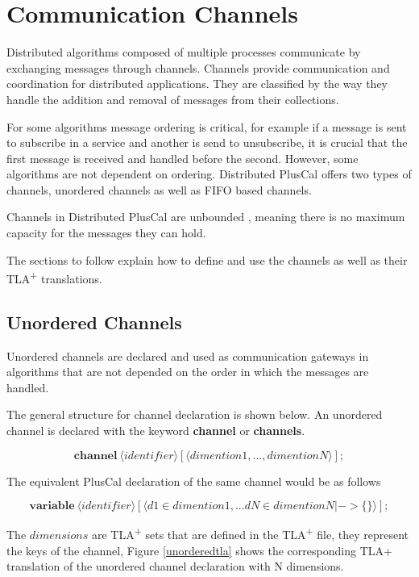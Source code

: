 \documentclass{thesul}
\newcommand{\tlaplus}{TLA\textsuperscript{+}\xspace}
\newcommand{\keyword}[1]{\textbf{#1}}
\newcommand{\entity}[1]{\ensuremath{\langle}#1\ensuremath{\rangle}}
\begin{document}
\FloatBarrier
\section{Communication Channels}
\label{comChannels}

Distributed algorithms composed of multiple processes communicate by exchanging messages through channels. Channels provide communication and coordination for distributed applications. They are classified by the way they handle the addition and removal of messages from their collections. 

For some algorithms message ordering is critical, for example if a message is sent to subscribe in a service and another is send to unsubscribe, it is crucial that the first message is received and handled before the second. However, some algorithms are not dependent on ordering. Distributed PlusCal offers two types of channels, unordered channels as well as FIFO based channels.

Channels in Distributed PlusCal are unbounded , meaning there is no maximum capacity for the messages they can hold.

The sections to follow explain how to define and use the channels as well as their \tlaplus translations. 

\subsection{Unordered Channels}

Unordered channels are declared and used as communication gateways in algorithms that are not depended on the order in which the messages are handled.

The general structure for channel declaration is shown below. An unordered channel is declared with the keyword \keyword{channel} or \keyword{channels}. 

\[
 \keyword{channel}\ \entity{identifier}[\entity{dimention1,...,dimentionN}];
\]

The equivalent PlusCal declaration of the same channel would be as follows

\[
 \keyword{variable}\ \entity{identifier}[\entity{d1 \in dimention1,... dN \in dimentionN |-> \{\}}];
\]

The $dimensions$ are \tlaplus sets that are defined in the \tlaplus file, they represent the keys of the channel, Figure \ref{unorderedtla} shows the corresponding TLA+ translation of the unordered channel declaration with N dimensions.
\end{document}
